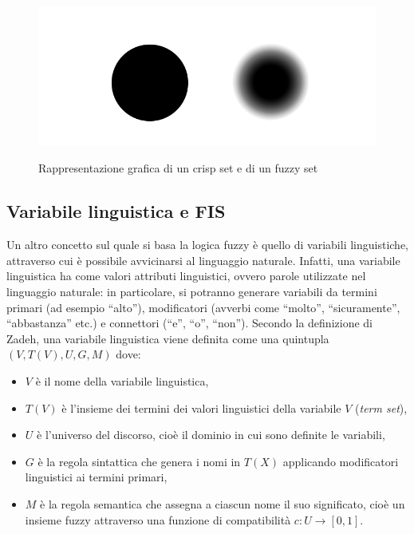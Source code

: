 \documentclass[11pt,  oneside, openany]{book}
\begin{document}
\begin{figure}[h!]
\begin{center}
  \includegraphics[width=13cm]{Immagini/fuzzyvscrisp.png}\\
  \caption{Rappresentazione grafica di un crisp set e di un fuzzy set}
\end{center}
\end{figure}



\subsection{Variabile linguistica e FIS}

Un altro concetto sul quale si basa la logica fuzzy è quello di variabili linguistiche, attraverso cui è possibile avvicinarsi al linguaggio naturale. Infatti, una variabile linguistica ha come valori attributi linguistici, ovvero parole utilizzate nel linguaggio naturale: in particolare, si potranno generare variabili da termini primari (ad esempio ``alto''), modificatori (avverbi come ``molto'', ``sicuramente'', ``abbastanza'' etc.)  e connettori (``e'', ``o'', ``non''). Secondo la definizione di Zadeh, una variabile linguistica viene definita come una quintupla $(V, T(V), U, G, M)$ dove: 

\begin{itemize}
\item $V$ è il nome della variabile linguistica, 
\item $T(V)$ è l'insieme dei termini dei valori linguistici della variabile $V$ (\textit{term set}), 
\item $U$ è l'universo del discorso, cioè il dominio in cui sono definite le variabili, 
\item $G$ è la regola sintattica che genera i nomi in $T(X)$ applicando modificatori linguistici ai termini primari, 
\item $M$ è la regola semantica che assegna a ciascun nome il suo significato, cioè un insieme fuzzy attraverso una funzione di compatibilità $c : U \to [0,1]$. 
\end{itemize}
\end{document}
